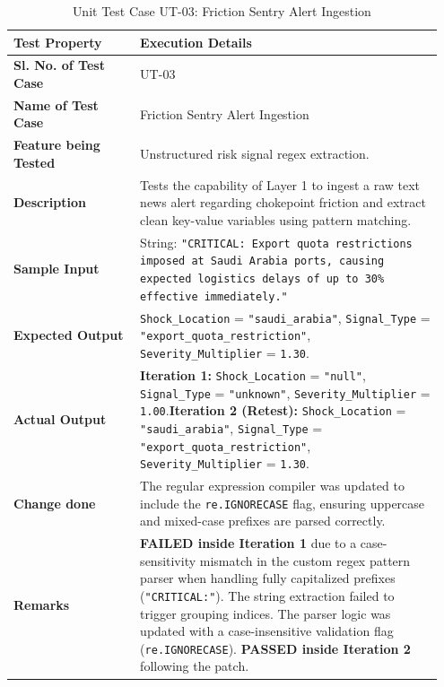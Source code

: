 \begin{table}[H]
    \centering
    \caption{Unit Test Case UT-03: Friction Sentry Alert Ingestion}
    \label{tab:ut03}
    \begin{tabular}{|p{0.28\linewidth}|p{0.67\linewidth}|}
        \hline
        \textbf{Test Property} & \textbf{Execution Details} \\ \hline
        \textbf{Sl. No. of Test Case} & UT-03 \\ \hline
        \textbf{Name of Test Case} & Friction Sentry Alert Ingestion \\ \hline
        \textbf{Feature being Tested} & Unstructured risk signal regex extraction. \\ \hline
        \textbf{Description} & Tests the capability of Layer 1 to ingest a raw text news alert regarding chokepoint friction and extract clean key-value variables using pattern matching. \\ \hline
        \textbf{Sample Input} & String: \texttt{"CRITICAL: Export quota restrictions imposed at Saudi Arabia ports, causing expected logistics delays of up to 30\% effective immediately."} \\ \hline
        \textbf{Expected Output} & \texttt{Shock\_Location} = \texttt{"saudi\_arabia"}, \texttt{Signal\_Type} = \texttt{"export\_quota\_restriction"}, \texttt{Severity\_Multiplier} = \texttt{1.30}. \\ \hline
        \textbf{Actual Output} & \textbf{Iteration 1:} \texttt{Shock\_Location} = \texttt{"null"}, \texttt{Signal\_Type} = \texttt{"unknown"}, \texttt{Severity\_Multiplier} = \texttt{1.00}.\newline \textbf{Iteration 2 (Retest):} \texttt{Shock\_Location} = \texttt{"saudi\_arabia"}, \texttt{Signal\_Type} = \texttt{"export\_quota\_restriction"}, \texttt{Severity\_Multiplier} = \texttt{1.30}. \\ \hline
        \textbf{Change done} & The regular expression compiler was updated to include the \texttt{re.IGNORECASE} flag, ensuring uppercase and mixed-case prefixes are parsed correctly. \\ \hline
        \textbf{Remarks} & \textbf{FAILED inside Iteration 1} due to a case-sensitivity mismatch in the custom regex pattern parser when handling fully capitalized prefixes (\texttt{"CRITICAL:"}). The string extraction failed to trigger grouping indices. The parser logic was updated with a case-insensitive validation flag (\texttt{re.IGNORECASE}). \textbf{PASSED inside Iteration 2} following the patch. \\ \hline
    \end{tabular}
\end{table}

